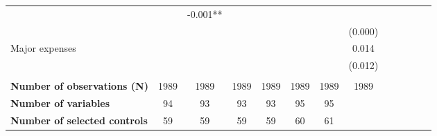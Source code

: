 \begin{center}
\begin{table}[th]
{\begin{tabular}{lcccccccccccc}
  \multicolumn{1}{c}{} &
  \multicolumn{1}{c}{} &
  \multicolumn{1}{c}{-0.001**} \\
\multicolumn{1}{l}{} &
  \multicolumn{1}{c}{} &
  \multicolumn{1}{c}{} &
  \multicolumn{1}{c}{} &
  \multicolumn{1}{c}{} &
  \multicolumn{1}{c}{} &
  \multicolumn{1}{c}{} &
  \multicolumn{1}{c}{(0.000)} \\
\multicolumn{1}{l}{Major expenses} &
  \multicolumn{1}{c}{} &
  \multicolumn{1}{c}{} &
  \multicolumn{1}{c}{} &
  \multicolumn{1}{c}{} &
  \multicolumn{1}{c}{} &
  \multicolumn{1}{c}{} &
  \multicolumn{1}{c}{0.014} \\
\multicolumn{1}{l}{} &
  \multicolumn{1}{c}{} &
  \multicolumn{1}{c}{} &
  \multicolumn{1}{c}{} &
  \multicolumn{1}{c}{} &
  \multicolumn{1}{c}{} &
  \multicolumn{1}{c}{} &
  \multicolumn{1}{c}{(0.012)} \\
\\
\multicolumn{1}{l}{{\bf Number of observations (N)}} &
  \multicolumn{1}{c}{1989} &
  \multicolumn{1}{c}{1989} &
  \multicolumn{1}{c}{1989} &
  \multicolumn{1}{c}{1989} &
  \multicolumn{1}{c}{1989} &
  \multicolumn{1}{c}{1989} &
  \multicolumn{1}{c}{1989} \\
\multicolumn{1}{l}{{\bf Number of variables}} &
  \multicolumn{1}{c}{94} &
  \multicolumn{1}{c}{93} &
  \multicolumn{1}{c}{93} &
  \multicolumn{1}{c}{93} &
  \multicolumn{1}{c}{95} &
  \multicolumn{1}{c}{95} &
  \multicolumn{1}{c}{} \\
\multicolumn{1}{l}{{\bf Number of selected controls}} &
  \multicolumn{1}{c}{59} &
  \multicolumn{1}{c}{59} &
  \multicolumn{1}{c}{59} &
  \multicolumn{1}{c}{59} &
  \multicolumn{1}{c}{60} &
  \multicolumn{1}{c}{61} &
  \multicolumn{1}{c}{} \\
\hline
\hline
\end{tabular}
}
\end{table}
\end{center}
